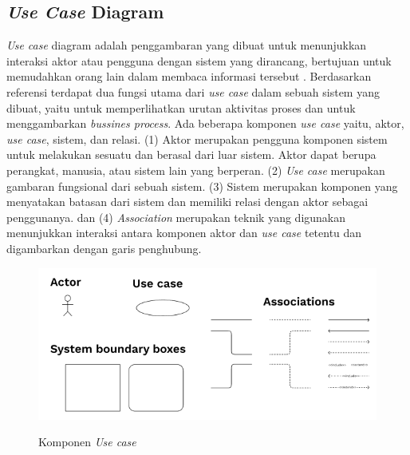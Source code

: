 \begin{flushleft}
\begin{justify}
        \subsection{\textit{Use Case} Diagram}
            \textit{Use case} diagram adalah penggambaran yang dibuat untuk menunjukkan interaksi aktor atau pengguna dengan sistem yang dirancang, bertujuan untuk memudahkan orang lain dalam membaca informasi tersebut \cite{use case 1,use case 2}.
            Berdasarkan referensi \cite{use case 1} terdapat dua fungsi utama dari \textit{use case} dalam sebuah sistem yang dibuat, yaitu untuk memperlihatkan urutan aktivitas proses dan untuk menggambarkan \textit{bussines process}. 
            Ada beberapa komponen \emph{use case} \cite{use case 1, figma uc} yaitu, aktor, \emph{use case}, sistem, dan relasi.
            (1) Aktor merupakan pengguna komponen sistem untuk melakukan sesuatu dan berasal dari luar sistem. Aktor dapat berupa perangkat, manusia, atau sistem lain yang berperan. (2) \emph{Use case} merupakan gambaran fungsional dari sebuah sistem. 
            (3) Sistem merupakan komponen yang menyatakan batasan dari sistem dan memiliki relasi dengan aktor sebagai penggunanya. dan (4) \emph{Association} merupakan teknik yang digunakan menunjukkan interaksi antara komponen aktor dan \emph{use case} tetentu dan digambarkan dengan garis penghubung.
            \begin{figure}[ht]
                \centering
                \includegraphics[width=12cm]{images/bab 2/use componen.png}\\
                \caption{Komponen \textit{Use case}}
            \end{figure}


\end{justify}
\end{flushleft}
